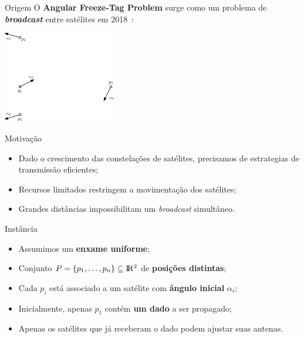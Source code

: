 
\stopcounter
\begin{frame}{Origem}
  O \textbf{Angular Freeze-Tag Problem} surge como um problema de \textbf{\emph{broadcast}} entre satélites em 2018~\cite{Fe18}:
  \bigbreak
  \begin{minipage}{\linewidth}
    \centering
    \includegraphics[height=4cm]{AFTP/instance/Temp-0.png}
  \end{minipage}
\end{frame}
\inccounter

\begin{frame}{Motivação}
  \begin{itemize}[<+->]
    \item Dado o crescimento das constelações de satélites, precisamos de estrategias de transmissão eficientes;
    
    \item Recursos limitados restringem a movimentação dos satélites;

    \item Grandes distâncias impossibilitam um \emph{broadcast} simultâneo.
  \end{itemize}
\end{frame}

\begin{frame}{Instância}
  \begin{itemize}[<+->]
    \item Assumimos um \textbf{enxame uniforme};

    \item Conjunto $P = \{p_1, \dots, p_n\}\subseteq \rm I\!R^2$ de \textbf{posições distintas};

    \item Cada $p_i$ está associado a um satélite com \textbf{ângulo inicial} $\alpha_i$;

    \item Inicialmente, apenas $p_1$ contém \textbf{um dado} a ser propagado;

    \item Apenas os satélites que já receberam o dado podem ajustar suas antenas.
  \end{itemize}
\end{frame}


